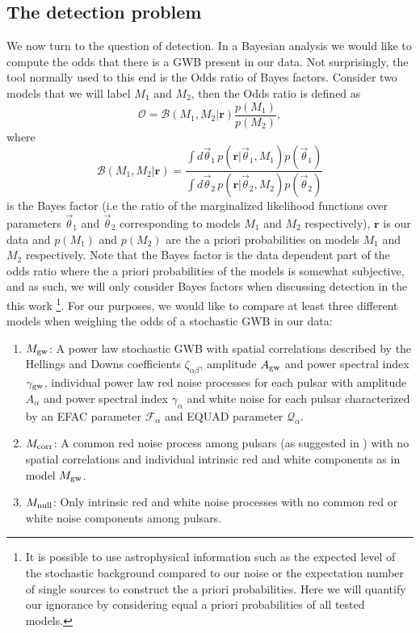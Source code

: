 \documentclass[iop]{emulateapj}
\newcommand{\be}{\begin{equation}}
\newcommand{\ee}{\end{equation}}
\begin{document}
 
\subsection{The detection problem}
We now turn to the question of detection. In a Bayesian analysis we would like to compute the odds that there is a GWB present in our data. Not surprisingly, the tool normally used to this end is the Odds ratio of Bayes factors. Consider two models that we will label $M_{1}$ and $M_{2}$, then the Odds ratio is defined as
\be
\mathcal{O}=\mathcal{B}(M_{1},M_{2}|\mathbf{r})\frac{p(M_{1})}{p(M_{2})},
\ee
 where
 \be
 \mathcal{B}(M_{1},M_{2}|\mathbf{r})=\frac{\int d\vec\theta_{1}\,p(\mathbf{r}|\vec\theta_{1},M_{1})p(\vec\theta_{1})}{\int d\vec\theta_{2}\,p(\mathbf{r}|\vec\theta_{2},M_{2})p(\vec\theta_{2})}
 \ee
 is the Bayes factor (i.e the ratio of the marginalized likelihood functions over parameters $\vec\theta_{1}$ and $\vec\theta_{2}$ corresponding to models $M_{1}$ and $M_{2}$ respectively), $\mathbf{r}$ is our data and $p(M_{1})$ and $p(M_{2})$ are the a priori probabilities on models $M_{1}$ and $M_{2}$ respectively. Note that the Bayes factor is the data dependent part of the odds ratio where the a priori probabilities of the models is somewhat subjective, and as such, we will only consider Bayes factors when discussing detection in the this work \footnote{It is possible to use astrophysical information such as the expected level of the stochastic background compared to our noise or the expectation number of single sources to construct the a priori probabilities. Here we will quantify our ignorance by considering equal a priori probabilities of all tested models.}. For our purposes, we would like to compare at least three different models when weighing the odds of a stochastic GWB in our data:
 \begin{enumerate}
 
 \item $M_{\rm gw}$: A power law stochastic GWB with spatial correlations described by the Hellings and Downs coefficients $\zeta_{\alpha\beta}$, amplitude $A_{\rm gw}$ and power spectral index $\gamma_{\rm gw}$, individual power law red noise processes for each pulsar with amplitude $A_{\alpha}$ and power spectral index $\gamma_{\alpha}$ and white noise for each pulsar characterized by an EFAC parameter $\mathcal{F}_{\alpha}$ and EQUAD parameter $\mathcal{Q}_{\alpha}$.
 
 \item $M_{\rm corr}$: A common red noise process among pulsars (as suggested in \cite{sc10}) with no spatial correlations and individual intrinsic red and white components as in model $M_{\rm gw}$.
 
 \item $M_{\rm null}$: Only intrinsic red and white noise processes with no common red or white noise components among pulsars.
 
 \end{enumerate}
\end{document}
